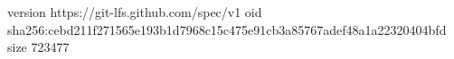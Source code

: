 version https://git-lfs.github.com/spec/v1
oid sha256:cebd211f271565e193b1d7968c15c475e91cb3a85767adef48a1a22320404bfd
size 723477
